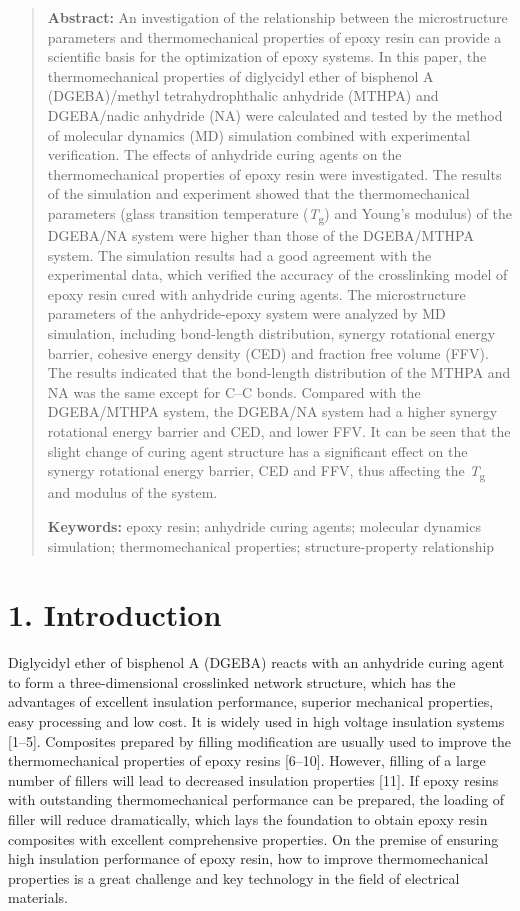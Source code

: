 \documentclass{article}
\begin{document}
\begin{quote}
\textbf{Abstract:} An investigation of the relationship between the microstructure parameters and thermomechanical properties of epoxy resin can provide a scientific basis for the optimization of epoxy systems. In this paper, the thermomechanical properties of diglycidyl ether of bisphenol A (DGEBA)/methyl tetrahydrophthalic anhydride (MTHPA) and DGEBA/nadic anhydride (NA) were calculated and tested by the method of molecular dynamics (MD) simulation combined with experimental verification. The effects of anhydride curing agents on the thermomechanical properties of epoxy resin were investigated. The results of the simulation and experiment showed that the thermomechanical parameters (glass transition temperature (\emph{T}\textsubscript{g}) and Young’s modulus) of the DGEBA/NA system were higher than those of the DGEBA/MTHPA system. The simulation results had a good agreement with the experimental data, which verified the accuracy of the crosslinking model of epoxy resin cured with anhydride curing agents. The microstructure parameters of the anhydride-epoxy system were analyzed by MD simulation, including bond-length distribution, synergy rotational energy barrier, cohesive energy density (CED) and fraction free volume (FFV). The results indicated that the bond-length distribution of the MTHPA and NA was the same except for C–C bonds. Compared with the DGEBA/MTHPA system, the DGEBA/NA system had a higher synergy rotational energy barrier and CED, and lower FFV. It can be seen that the slight change of curing agent structure has a significant effect on the synergy rotational energy barrier, CED and FFV, thus affecting the \emph{T}\textsubscript{g} and modulus of the system.

\textbf{Keywords:} epoxy resin; anhydride curing agents; molecular dynamics simulation; thermomechanical properties; structure-property relationship
\end{quote}

\section*{1. Introduction}

Diglycidyl ether of bisphenol A (DGEBA) reacts with an anhydride curing agent to form a three-dimensional crosslinked network structure, which has the advantages of excellent insulation performance, superior mechanical properties, easy processing and low cost. It is widely used in high voltage insulation systems [1–5]. Composites prepared by filling modification are usually used to improve the thermomechanical properties of epoxy resins [6–10]. However, filling of a large number of fillers will lead to decreased insulation properties [11]. If epoxy resins with outstanding thermomechanical performance can be prepared, the loading of filler will reduce dramatically, which lays the foundation to obtain epoxy resin composites with excellent comprehensive properties. On the premise of ensuring high insulation performance of epoxy resin, how to improve thermomechanical properties is a great challenge and key technology in the field of electrical materials.
\end{document}

